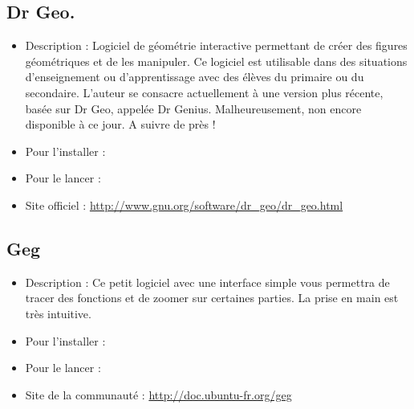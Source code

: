 \subsection{Dr Geo.}
\begin{itemize}
\begingroup
{}
\item Description : Logiciel de géométrie interactive permettant de créer des figures géométriques et de les manipuler. Ce logiciel est utilisable dans des situations d'enseignement ou d'apprentissage avec des élèves du primaire ou du secondaire. L'auteur se consacre actuellement à une version plus récente, basée sur Dr Geo, appelée Dr Genius. Malheureusement, non encore disponible à ce jour. A suivre de près !{\par}
\item Pour l'installer : 
\item Pour le lancer : 
\item Site officiel : \url{http://www.gnu.org/software/dr_geo/dr_geo.html}{\par}
\endgroup
\end{itemize}
\subsection{Geg}
\begin{itemize}
\begingroup
{}
\item Description : Ce petit logiciel avec une interface simple vous permettra de tracer des fonctions et de zoomer sur certaines parties. La prise en main est très intuitive.{\par}
\item Pour l'installer : 
\item Pour le lancer : 
\item Site de la communauté : \url{http://doc.ubuntu-fr.org/geg}{\par}
\endgroup
\end{itemize}
